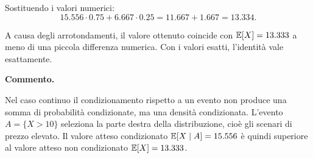 Sostituendo i valori numerici:
\[
15.556\cdot0.75
+
6.667\cdot0.25
=
11.667+1.667
=
13.334.
\]

A causa degli arrotondamenti, il valore ottenuto coincide con
$\mathbb{E}[X]=13.333$ a meno di una piccola differenza numerica. Con i valori
esatti, l'identit\`{a} vale esattamente.

\medskip

\noindent
\textbf{Commento.}

Nel caso continuo il condizionamento rispetto a un evento non produce una
somma di probabilit\`{a} condizionate, ma una densit\`{a} condizionata.
L'evento $A=\{X>10\}$ seleziona la parte destra della distribuzione, cio\`{e}
gli scenari di prezzo elevato. Il valore atteso condizionato
$\mathbb{E}[X\mid A]=15.556$ \`{e} quindi superiore al valore atteso non
condizionato $\mathbb{E}[X]=13.333$.

